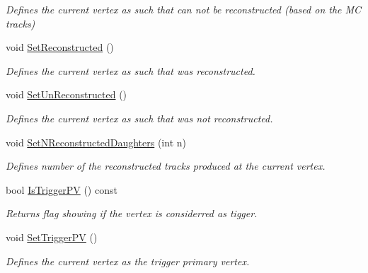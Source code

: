 \begin{DoxyCompactItemize}
\begin{DoxyCompactList}\small\item\em Defines the current vertex as such that can not be reconstructed (based on the MC tracks) \end{DoxyCompactList}\item 
void \hyperlink{classKFMCVertex_a3c20061e84e4df81331f095f64813fcf}{Set\+Reconstructed} ()\hypertarget{classKFMCVertex_a3c20061e84e4df81331f095f64813fcf}{}\label{classKFMCVertex_a3c20061e84e4df81331f095f64813fcf}

\begin{DoxyCompactList}\small\item\em Defines the current vertex as such that was reconstructed. \end{DoxyCompactList}\item 
void \hyperlink{classKFMCVertex_ae6338729915e9c39ef56bba7ba86af35}{Set\+Un\+Reconstructed} ()\hypertarget{classKFMCVertex_ae6338729915e9c39ef56bba7ba86af35}{}\label{classKFMCVertex_ae6338729915e9c39ef56bba7ba86af35}

\begin{DoxyCompactList}\small\item\em Defines the current vertex as such that was not reconstructed. \end{DoxyCompactList}\item 
void \hyperlink{classKFMCVertex_a801d833c5009f7bad8c136b68434c10a}{Set\+N\+Reconstructed\+Daughters} (int n)\hypertarget{classKFMCVertex_a801d833c5009f7bad8c136b68434c10a}{}\label{classKFMCVertex_a801d833c5009f7bad8c136b68434c10a}

\begin{DoxyCompactList}\small\item\em Defines number of the reconstructed tracks produced at the current vertex. \end{DoxyCompactList}\item 
bool \hyperlink{classKFMCVertex_a6858848001a3bffdf36e9c0644dfdf61}{Is\+Trigger\+PV} () const \hypertarget{classKFMCVertex_a6858848001a3bffdf36e9c0644dfdf61}{}\label{classKFMCVertex_a6858848001a3bffdf36e9c0644dfdf61}

\begin{DoxyCompactList}\small\item\em Returns flag showing if the vertex is considerred as tigger. \end{DoxyCompactList}\item 
void \hyperlink{classKFMCVertex_ac12fdb952def60c6233f34ca8ef75b6b}{Set\+Trigger\+PV} ()\hypertarget{classKFMCVertex_ac12fdb952def60c6233f34ca8ef75b6b}{}\label{classKFMCVertex_ac12fdb952def60c6233f34ca8ef75b6b}

\begin{DoxyCompactList}\small\item\em Defines the current vertex as the trigger primary vertex. \end{DoxyCompactList}\end{DoxyCompactItemize}
